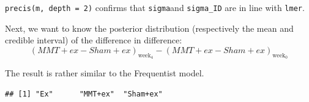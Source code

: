 \documentclass[
]{article}
\newenvironment{Shaded}{\begin{snugshade}}{\end{snugshade}}
\newcommand{\CommentTok}[1]{\textcolor[rgb]{0.56,0.35,0.01}{\textit{#1}}}
\newcommand{\FunctionTok}[1]{\textcolor[rgb]{0.13,0.29,0.53}{\textbf{#1}}}
\newcommand{\NormalTok}[1]{#1}
\newcommand{\SpecialCharTok}[1]{\textcolor[rgb]{0.81,0.36,0.00}{\textbf{#1}}}
\begin{document}
\texttt{precis(m,\ depth\ =\ 2)} confirms that \texttt{sigma}and
\texttt{sigma\_ID} are in line with \texttt{lmer}.

Next, we want to know the posterior distribution (respectively the mean
and credible interval) of the difference in difference:
\[(MMT+ex - Sham+ex)_{\text{week}_4} - (MMT+ex - Sham+ex)_{\text{week}_0}\]

The result is rather similar to the Frequentist model.

\begin{Shaded}
\end{Shaded}

\begin{verbatim}
## [1] "Ex"      "MMT+ex"  "Sham+ex"
\end{verbatim}
\end{document}

